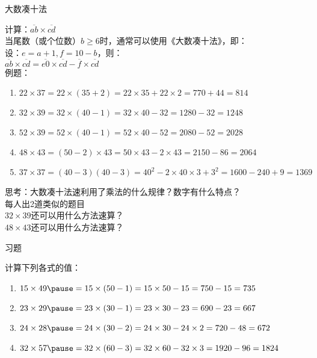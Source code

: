 \documentclass[aspectratio=169]{ctexbeamer} %
\begin{document}
\begin{frame}[t]{大数凑十法}
\begin{spacing}{1.2}
\normalsize
计算：$\overline{ab} \times \overline{cd}$ \\
当尾数（或个位数）$b \ge 6$时，通常可以使用《大数凑十法》，即：\\
设：$e = a+1, f = 10-b$，则：\\
$\overline{ab} \times \overline{cd} = \overline{e0} \times \overline{cd} - \overline{f} \times \overline{cd}$ \\
例题：
\begin{enumerate}[label={\arabic*.}]
\item $22 \times 37 = 22 \times (35+2) = 22 \times 35 + 22 \times 2 = 770 + 44 = 814$
\item $32 \times 39 = 32 \times (40-1)=32 \times 40 - 32=1280-32=1248$
\item $52 \times 39 = 52 \times (40-1)=52 \times 40 - 52=2080-52=2028$
\item $48 \times 43 = (50-2) \times 43=50 \times 43 - 2 \times 43=2150-86=2064$
\item $37 \times 37 = (40-3)(40-3)=40^2 - 2\times40\times3 +3^2=1600-240+9=1369$

\end{enumerate}
\alert{思考：大数凑十法速利用了乘法的什么规律？数字有什么特点？}\\
\alert{每人出2道类似的题目}  \\
\alert{$32 \times 39 $还可以用什么方法速算？} \\
\alert{$48 \times 43 $还可以用什么方法速算？}
\end{spacing}
\end{frame}

\begin{frame}[t]{习题}
\begin{spacing}{1.2}
\normalsize
计算下列各式的值：
\begin{enumerate}[label={\arabic*.}]
\item $15 \times 49 \pause = 15 \times (50-1) = 15 \times 50 - 15 = 750 - 15 = 735$
\item $23 \times 29 \pause = 23 \times (30-1) = 23 \times 30 - 23 = 690 - 23 = 667$
\item $24 \times 28 \pause = 24 \times (30-2) = 24 \times 30 - 24 \times 2 = 720 - 48 = 672$
\item $32 \times 57 \pause = 32 \times (60-3) = 32 \times 60 - 32 \times 3 = 1920 - 96 = 1824$
\end{enumerate}

\end{spacing}
\end{frame}
\end{document}
